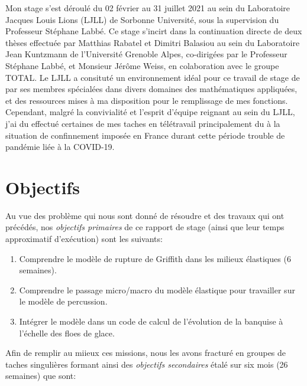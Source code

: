 Mon stage s'est déroulé du 02 février au 31 juillet 2021 au sein du Laboratoire Jacques Louis Lions (LJLL) de Sorbonne Université, sous la supervision du Professeur Stéphane Labbé. Ce stage s'incirt dans la continuation directe de deux thèses effectuée par Matthias Rabatel \Parencite{rabatel2015thesis} et Dimitri Balasiou \parencite{balasoiu2020halthesis} au sein du Laboratoire Jean Kuntzmann de l'Université Grenoble Alpes, co-dirigées par le Professeur Stéphane Labbé, et Monsieur Jérôme Weiss, en colaboration avec le groupe TOTAL. Le LJLL a consituté un environnement idéal pour ce travail de stage de par ses membres spécialées dans divers domaines des mathématiques appliquées, et des ressources mises à ma disposition pour le remplissage de mes fonctions. Cependant, malgré la convivialité et l'esprit d'équipe reignant au sein du LJLL, j'ai  du effectué certaines de mes taches en télétravail principalement du à la situation de confinnement imposée en France durant cette période trouble de pandémie liée à la COVID-19.








\section{Objectifs}
\label{sec:introobk}

Au vue des problème qui nous sont donné de résoudre et des travaux qui ont précédés, nos \emph{objectifs primaires} de ce rapport de stage (ainsi que leur temps approximatif d'exécution) sont les suivants:
\begin{enumerate}
    \item Comprendre le modèle de rupture de Griffith dans les milieux élastiques (6 semaines).
    \item Comprendre le passage micro/macro du modèle élastique pour travailler sur le modèle de percussion. 
    \item Intégrer le modèle dans un code de calcul de l’évolution
    de la banquise à l’échelle des floes de glace.
\end{enumerate}

Afin de remplir au miieux ces missions, nous les avons fracturé en groupes de taches singulières formant ainsi des \emph{objectifs secondaires} étalé sur six mois (26 semaines) que sont:   


